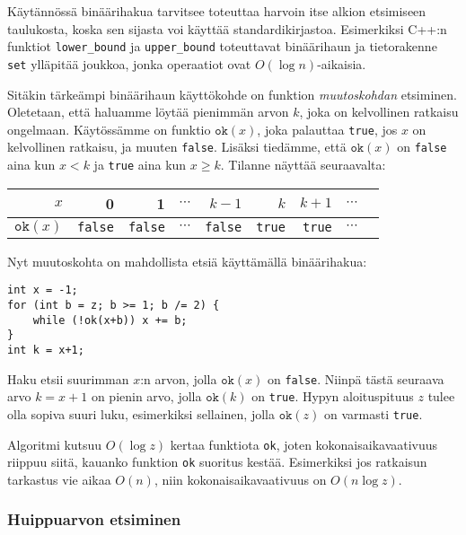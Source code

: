 Käytännössä binäärihakua tarvitsee toteuttaa
harvoin itse alkion etsimiseen taulukosta,
koska sen sijasta voi käyttää standardikirjastoa.
Esimerkiksi C++:n funktiot \texttt{lower\_bound}
ja \texttt{upper\_bound} toteuttavat binäärihaun
ja tietorakenne \texttt{set} ylläpitää joukkoa,
jonka operaatiot ovat $O(\log n)$-aikaisia.

Sitäkin tärkeämpi binäärihaun käyttökohde on 
funktion \emph{muutoskohdan} etsiminen.
Oletetaan, että haluamme löytää pienimmän arvon $k$,
joka on kelvollinen ratkaisu ongelmaan.
Käytössämme on funktio $\texttt{ok}(x)$,
joka palauttaa \texttt{true}, jos $x$ on kelvollinen
ratkaisu, ja muuten \texttt{false}.
Lisäksi tiedämme, että $\texttt{ok}(x)$ on \texttt{false}
aina kun $x<k$ ja \texttt{true} aina kun $x \geq k$.
Tilanne näyttää seuraavalta:

\begin{center}
\begin{tabular}{r|rrrrrrrr}
$x$ & 0 & 1 & $\cdots$ & $k-1$ & $k$ & $k+1$ & $\cdots$ \\
\hline
$\texttt{ok}(x)$ & \texttt{false} & \texttt{false}
& $\cdots$ & \texttt{false} & \texttt{true} & \texttt{true} & $\cdots$ \\
\end{tabular}
\end{center}

\noindent
Nyt muutoskohta on mahdollista etsiä käyttämällä
binäärihakua:

\begin{lstlisting}
int x = -1;
for (int b = z; b >= 1; b /= 2) {
    while (!ok(x+b)) x += b;
}
int k = x+1;
\end{lstlisting}

Haku etsii suurimman $x$:n arvon,
jolla $\texttt{ok}(x)$ on \texttt{false}.
Niinpä tästä seuraava arvo $k=x+1$
on pienin arvo, jolla $\texttt{ok}(k)$ on \texttt{true}.
Hypyn aloituspituus $z$ tulee olla 
sopiva suuri luku, esimerkiksi sellainen,
jolla $\texttt{ok}(z)$ on varmasti \texttt{true}.

Algoritmi kutsuu $O(\log z)$ kertaa funktiota
\texttt{ok}, joten kokonaisaikavaativuus
riippuu siitä, kauanko funktion \texttt{ok}
suoritus kestää.
Esimerkiksi jos ratkaisun tarkastus
vie aikaa $O(n)$, niin kokonaisaikavaativuus
on $O(n \log z)$.

\subsubsection{Huippuarvon etsiminen}

